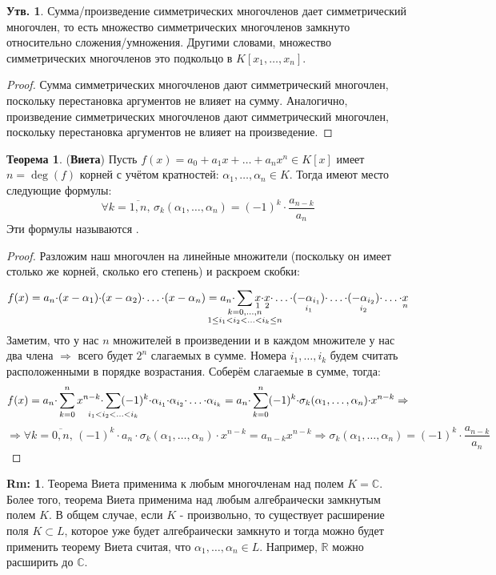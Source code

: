 \documentclass[12pt]{article}
\newcommand{\MR}{\mathbb{R}}
\newcommand{\MC}{\mathbb{C}}
\theoremstyle{definition}
\newtheorem{rem}{Rm:}
\newtheorem{prop}{Утв.}
\newtheorem{theorem}{Теорема}
\newcommand{\ddsum}[2]{\displaystyle\sum\limits_{#1}^{#2}}
\newcommand{\ddssum}[2]{\displaystyle\smashoperator{\sum\limits_{#1}^{#2}}}
\newcommand{\ovl}[1]{\overline{#1}}
\begin{document}
\begin{prop}
	Сумма/произведение симметрических многочленов дает симметрический многочлен, то есть множество симметрических многочленов замкнуто относительно сложения/умножения. Другими словами, множество симметрических многочленов это подкольцо в $K[x_1,\dotsc,x_n]$.
\end{prop}
\begin{proof}
	Сумма симметрических многочленов дают симметрический многочлен, поскольку перестановка аргументов не влияет на сумму. Аналогично, произведение симметрических многочленов дают симметрический многочлен, поскольку перестановка аргументов не влияет на произведение.
\end{proof}

\begin{theorem}(\textbf{Виета})
	Пусть $f(x) = a_0 + a_1x + \dotsc + a_n x^n \in K[x]$ имеет  $n = \deg(f)$ корней с учётом кратностей: $\alpha_1,\dotsc,\alpha_n \in K$. Тогда имеют место следующие формулы:
	$$
		\forall k = \ovl{1,n}, \, \sigma_k(\alpha_1,\dotsc,\alpha_n) = (-1)^k{\cdot}\dfrac{a_{n-k}}{a_n}
	$$
	Эти формулы называются .
\end{theorem}
\begin{proof}
	Разложим наш многочлен на линейные множители (поскольку он имеет столько же корней, сколько его степень) и раскроем скобки:
	$$
		f(x) = a_n{\cdot}(x - \alpha_1){\cdot}(x - \alpha_2){\cdot}\dotsc{\cdot}(x - \alpha_n) = a_n {\cdot} \ddssum{\substack{k =0,\dotsc,n \\1\leq i_1 < i_2 < \dotsc < i_k \leq n}}{}\underset{1}{x}{\cdot}\underset{2}{x}{\cdot}\dotsc{\cdot}\underset{i_1}{(-\alpha_{i_1})}{\cdot}\dotsc{\cdot}\underset{i_2}{(-\alpha_{i_2})}{\cdot}\dotsc{\cdot}\underset{n}{x}
	$$
	Заметим, что у нас $n$ множителей в произведении и в каждом множителе у нас два члена $\Rightarrow$ всего будет $2^n$ слагаемых в  сумме. Номера $i_1,\dotsc,i_k$ будем считать расположенными в порядке возрастания. Соберём слагаемые в сумме, тогда:
	$$
		f(x) = a_n{\cdot}\ddsum{k = 0}{n}x^{n-k}{\cdot}\ddssum{i_1 < i_2 < \dotsc < i_k}{}(-1)^k{\cdot}\alpha_{i_1}{\cdot}\alpha_{i_2}{\cdot}\dotsc{\cdot}\alpha_{i_k} = a_n{\cdot}\ddsum{k = 0}{n}(-1)^k{\cdot}\sigma_k(\alpha_1,\dotsc,\alpha_n){\cdot}x^{n-k} \Rightarrow
	$$
	$$
		\Rightarrow \forall k = \ovl{0,n}, \, (-1)^k{\cdot}a_n{\cdot}\sigma_k(\alpha_1,\dotsc,\alpha_n){\cdot}x^{n-k} = a_{n-k}x^{n-k} \Rightarrow \sigma_k(\alpha_1,\dotsc,\alpha_n) = (-1)^{k}{\cdot}\dfrac{a_{n-k}}{a_n}
	$$
\end{proof}
\begin{rem}
	Теорема Виета применима к любым многочленам над полем $K = \MC$. Более того, теорема Виета применима над любым алгебраически замкнутым полем $K$. В общем случае, если $K$ - произвольно, то существует расширение поля $K \subset L$, которое уже будет алгебраически замкнуто и тогда можно будет применить теорему Виета считая, что  $\alpha_1,\dotsc,\alpha_n \in L$. Например, $\MR$ можно расширить до $\MC$.
\end{rem}
\end{document}
